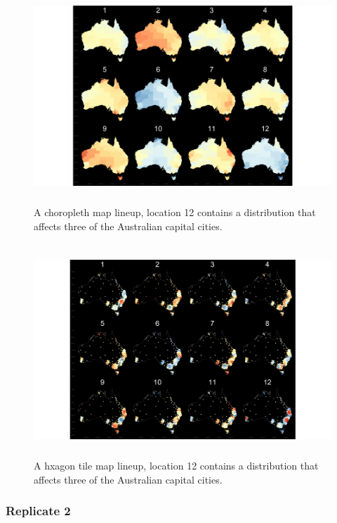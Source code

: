 \documentclass{monashthesis}
\begin{document}
\begin{figure}[H]
\centering
\includegraphics[height=8cm]{lineups/three-geo12-1.pdf}
\caption{\label{fig:three-geo12}A choropleth map lineup, location 12 contains a distribution that affects three of the Australian capital cities.}
\end{figure}

\begin{figure}[H]
\centering
\includegraphics[height=8cm]{lineups/three-hex12-1.pdf}
\caption{\label{fig:three-hex12}A hxagon tile map lineup, location 12 contains a distribution that affects three of the Australian capital cities.}
\end{figure}

\hypertarget{replicate-2-1}{%
\subsubsection{Replicate 2}\label{replicate-2-1}}
\end{document}
